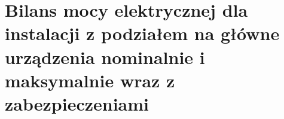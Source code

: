 \section{Bilans mocy elektrycznej dla instalacji z podziałem na główne urządzenia
nominalnie i maksymalnie wraz z zabezpieczeniami}